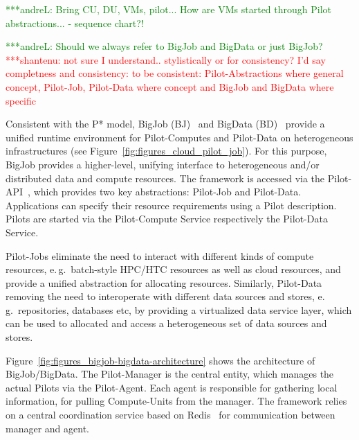 \documentclass[times]{cpeauth}
\newcommand{\jhanote}[1]{ {\textcolor{red} { ***shantenu: #1 }}}
\newcommand{\alnote}[1]{ {\textcolor{green} { ***andreL: #1 }}}
\newcommand{\alnote}[1]{}
\newcommand{\jhanote}[1]{}
\newcommand{\pilot}{Pilot\xspace}
\newcommand{\pilots}{Pilots\xspace}
\newcommand{\pilotjob}{Pilot-Job\xspace}
\newcommand{\pilotjobs}{Pilot-Jobs\xspace}
\newcommand{\pilotcomputes}{Pilot-Computes\xspace}
\newcommand{\pilotdata}{Pilot-Data\xspace}
\newcommand{\pilotdataservice}{Pilot-Data Service\xspace}
\newcommand{\pilotcomputeservice}{Pilot-Compute Service\xspace}
\newcommand{\computeunits}{Compute-Units\xspace}
\begin{document}

\alnote{Bring CU, DU, VMs, pilot... How are VMs started through Pilot
  abstractions... - sequence chart?!}  


\alnote{Should we always refer to BigJob and BigData or just BigJob?}
\jhanote{not sure I understand.. stylistically or for consistency?
  I'd say completness and consistency: to be consistent:
  \pilot-Abstractions where general concept, \pilotjob, \pilotdata
  where concept and BigJob and BigData where specific}

Consistent with the P* model, BigJob
(BJ)~\cite{saga_bigjob_condor_cloud} and BigData
(BD)~\cite{Mantha:2012:PEF:2287016.2287020} provide a unified runtime
environment for \pilotcomputes and \pilotdata on heterogeneous
infrastructures (see Figure~\ref{fig:figures_cloud_pilot_job}). For
this purpose, BigJob provides a higher-level, unifying interface to
heterogeneous and/or distributed data and compute resources. The
framework is accessed via the \pilot-API~\cite{pilot_api}, which
provides two key abstractions: \pilotjob and \pilotdata. Applications
can specify their resource requirements using a \pilot
description. \pilots are started via the \pilotcomputeservice
respectively the \pilotdataservice.

\pilotjobs eliminate the need to interact with different kinds of compute 
resources, e.\,g.\ batch-style HPC/HTC resources as well as cloud resources, 
and provide a unified abstraction for allocating resources. Similarly, 
\pilotdata removing the need to interoperate with different data sources and 
stores, e.\,g.\ repositories, databases etc, by providing a virtualized data 
service layer, which can be used to allocated and access a heterogeneous set 
of data sources and stores.



Figure~\ref{fig:figures_bigjob-bigdata-architecture} shows the architecture of
BigJob/BigData. The \pilot-Manager is the central entity, which manages the
actual \pilots via the \pilot-Agent. Each agent is responsible for gathering
local information, for pulling \computeunits from the manager. The framework
relies on a central coordination service based on Redis~\cite{redis} for
communication between manager and agent.
\end{document}
